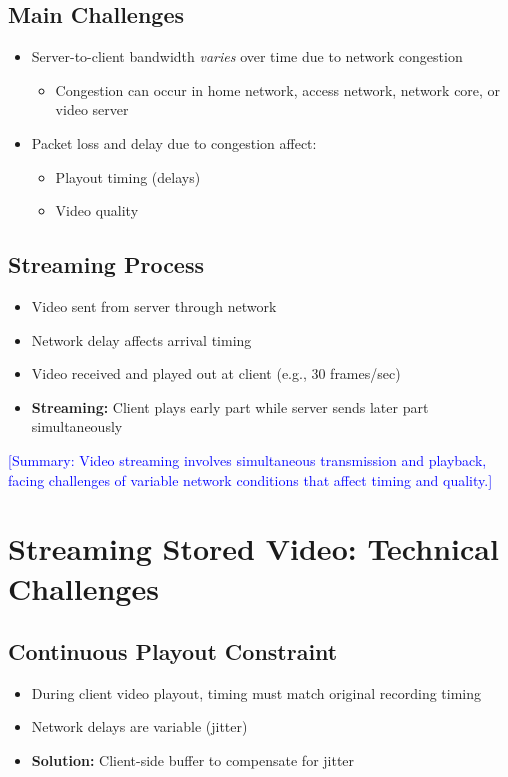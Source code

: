\documentclass[12pt]{article}
\begin{document}
\subsection{Main Challenges}
\begin{itemize}
    \item Server-to-client bandwidth \textit{varies} over time due to network congestion
          \begin{itemize}
              \item Congestion can occur in home network, access network, network core, or video server
          \end{itemize}

    \item Packet loss and delay due to congestion affect:
          \begin{itemize}
              \item Playout timing (delays)
              \item Video quality
          \end{itemize}
\end{itemize}

\subsection{Streaming Process}
\begin{itemize}
    \item Video sent from server through network
    \item Network delay affects arrival timing
    \item Video received and played out at client (e.g., 30 frames/sec)
    \item \textbf{Streaming:} Client plays early part while server sends later part simultaneously
\end{itemize}

\textcolor{blue}{[Summary: Video streaming involves simultaneous transmission and playback, facing challenges of variable network conditions that affect timing and quality.]}

\section{Streaming Stored Video: Technical Challenges}

\subsection{Continuous Playout Constraint}
\begin{itemize}
    \item During client video playout, timing must match original recording timing
    \item Network delays are variable (jitter)
    \item \textbf{Solution:} Client-side buffer to compensate for jitter
\end{itemize}
\end{document}
